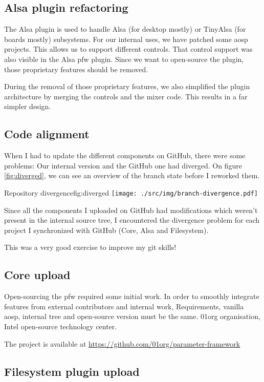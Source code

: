\subsection{Alsa plugin refactoring}
The Alsa plugin is used to handle Alsa (for desktop mostly) or TinyAlsa (for boards mostly) subsystems.
For our internal uses, we have patched some \gls{aosp} projects.
This allows us to support different controls.
That control support was also visible in the Alsa \gls{pfw} plugin. Since
we want to open-source the plugin, those proprietary features should be removed.

During the removal of those proprietary features, we also simplified the plugin
architecture by merging the controls and the mixer code.
This results in a far simpler design.

\subsection{Code alignment}

When I had to update the different components on \gls{GitHub}, there were some problems:
Our internal version and the \gls{GitHub} one had diverged.
On figure \ref{fig:diverged}, we can see an overview of the branch state before I reworked them.

\begin{figureGraphics}{Repository divergence}{fig:diverged}
    \texttt{[image: ./src/img/branch-divergence.pdf]}
\end{figureGraphics}
Since all the components I uploaded on \gls{GitHub} had modifications which weren't present
in the internal source tree, I encountered the divergence problem for each project I
synchronized with \gls{GitHub} (Core, Alsa and Filesystem).

This was a very good exercise to improve my \gls{git} skills!

\subsection{Core upload}
Open-sourcing the \gls{pfw} required some initial work.
In order to smoothly integrate features from external contributors and internal work,
Requirements, vanilla \gls{aosp}, internal tree and open-source version must be the
same.
01org organisation, Intel open-source technology center.

The project is available at \url{https://github.com/01org/parameter-framework}

\subsection{Filesystem plugin upload}

